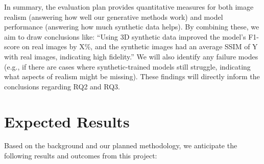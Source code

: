 \documentclass[
oneside,      %
openany       %
]{imc-inf}
\begin{document}
	\vspace{1.5em}
	In summary, the evaluation plan provides quantitative measures for both image realism (answering how well our generative methods work) and model performance (answering how much synthetic data helps). By combining these, we aim to draw conclusions like: “Using 3D synthetic data improved the model’s F1-score on real images by X\%, and the synthetic images had an average SSIM of Y with real images, indicating high fidelity.” We will also identify any failure modes (e.g., if there are cases where synthetic-trained models still struggle, indicating what aspects of realism might be missing). These findings will directly inform the conclusions regarding RQ2 and RQ3.
	
	
	\chapter{Expected Results}\label{chap:expected-results}
	Based on the background and our planned methodology, we anticipate the following results and outcomes from this project:
	
\end{document}
